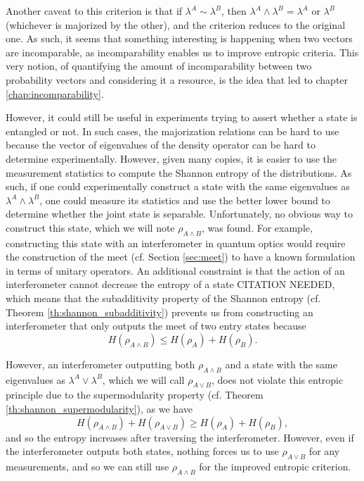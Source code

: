 Another caveat to this criterion is that if $\lambda^A \sim \lambda^B$, then $\lambda^A \wedge \lambda^B = \lambda^A$ or $\lambda^B$ (whichever is majorized by the other), and the criterion reduces to the original one. As such, it seems that something interesting is happening when two vectors are incomparable, as incomparability enables us to improve entropic criteria. This very notion, of quantifying the amount of incomparability between two probability vectors and considering it a resource, is the idea that led to chapter \ref{chap:incomparability}.

However, it could still be useful in experiments trying to assert whether a state is entangled or not. In such cases, the majorization relations can be hard to use because the vector of eigenvalues of the density operator can be hard to determine experimentally. However, given many copies, it is easier to use the measurement statistics to compute the Shannon entropy of the distributions. As such, if one could experimentally construct a state with the same eigenvalues as $\lambda^A \wedge \lambda^B$, one could measure its statistics and use the better lower bound to determine whether the joint state is separable. Unfortunately, no obvious way to construct this state, which we will note $\rho_{A \wedge B}$, was found. For example, constructing this state with an interferometer in quantum optics would require the construction of the meet (cf. Section \ref{sec:meet}) to have a known formulation in terms of unitary operators. An additional constraint is that the action of an interferometer cannot decrease the entropy of a state CITATION NEEDED, which means that the subadditivity property of the Shannon entropy (cf. Theorem \ref{th:shannon_subadditivity}) prevents us from constructing an interferometer that only outputs the meet of two entry states because
\begin{equation}
    H(\rho_{A \wedge B}) \leq H(\rho_A) + H(\rho_B).
\end{equation}

However, an interferometer outputting both $\rho_{A \wedge B}$ and a state with the same eigenvalues as $\lambda^A \vee \lambda^B$, which we will call $\rho_{A \vee B}$, does not violate this entropic principle due to the supermodularity property (cf. Theorem \ref{th:shannon_supermodularity}), as we have
\begin{equation}
    H(\rho_{A \wedge B}) + H(\rho_{A \vee B}) \geq H(\rho_A) + H(\rho_B),
\end{equation}
\noindent and so the entropy increases after traversing the interferometer. However, even if the interferometer outputs both states, nothing forces us to use $\rho_{A \vee B}$ for any measurements, and so we can still use $\rho_{A \wedge B}$ for the improved entropic criterion.

